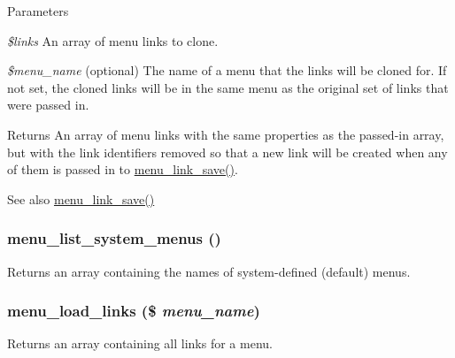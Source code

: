 \begin{DoxyParams}{Parameters}
\item[{\em \$links}]An array of menu links to clone. \item[{\em \$menu\_\-name}](optional) The name of a menu that the links will be cloned for. If not set, the cloned links will be in the same menu as the original set of links that were passed in.\end{DoxyParams}
\begin{DoxyReturn}{Returns}
An array of menu links with the same properties as the passed-\/in array, but with the link identifiers removed so that a new link will be created when any of them is passed in to \hyperlink{group__menu_ga133b177fee00b678a19afba18fb81ebc}{menu\_\-link\_\-save()}.
\end{DoxyReturn}
\begin{DoxySeeAlso}{See also}
\hyperlink{group__menu_ga133b177fee00b678a19afba18fb81ebc}{menu\_\-link\_\-save()} 
\end{DoxySeeAlso}
\hypertarget{group__menu_ga28e765ff428a3f18978af564ee0147d6}{
\subsubsection[{menu\_\-list\_\-system\_\-menus}]{\setlength{\rightskip}{0pt plus 5cm}menu\_\-list\_\-system\_\-menus ()}}
\label{group__menu_ga28e765ff428a3f18978af564ee0147d6}
Returns an array containing the names of system-\/defined (default) menus. \hypertarget{group__menu_gac82038848d5c321b972769ff821d4aa1}{
\subsubsection[{menu\_\-load\_\-links}]{\setlength{\rightskip}{0pt plus 5cm}menu\_\-load\_\-links (\$ {\em menu\_\-name})}}
\label{group__menu_gac82038848d5c321b972769ff821d4aa1}
Returns an array containing all links for a menu.



